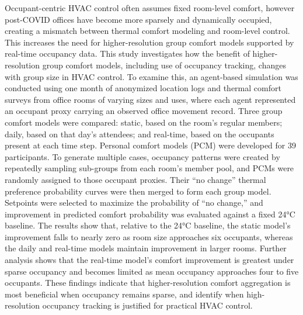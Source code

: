 
Occupant-centric HVAC control often assumes fixed room-level comfort, however post-COVID offices have become more sparsely and dynamically occupied, creating a mismatch between thermal comfort modeling and room-level control.
This increases the need for higher-resolution group comfort models supported by real-time occupancy data.
This study investigates how the benefit of higher-resolution group comfort models, including use of occupancy tracking, changes with group size in HVAC control.
To examine this, an agent-based simulation was conducted using one month of anonymized location logs and thermal comfort surveys from office rooms of varying sizes and uses, where each agent represented an occupant proxy carrying an observed office movement record.
Three group comfort models were compared: static, based on the room’s regular members; daily, based on that day’s attendees; and real-time, based on the occupants present at each time step.
Personal comfort models (PCM) were developed for 39 participants.
To generate multiple cases, occupancy patterns were created by repeatedly sampling sub-groups from each room’s member pool, and PCMs were randomly assigned to those occupant proxies.
Their “no change” thermal preference probability curves were then merged to form each group model.
Setpoints were selected to maximize the probability of “no change,” and improvement in predicted comfort probability was evaluated against a fixed 24°C baseline.
The results show that, relative to the 24°C baseline, the static model’s improvement falls to nearly zero as room size approaches six occupants, whereas the daily and real-time models maintain improvement in larger rooms.
Further analysis shows that the real-time model’s comfort improvement is greatest under sparse occupancy and becomes limited as mean occupancy approaches four to five occupants.
These findings indicate that higher-resolution comfort aggregation is most beneficial when occupancy remains sparse, and identify when high-resolution occupancy tracking is justified for practical HVAC control.

